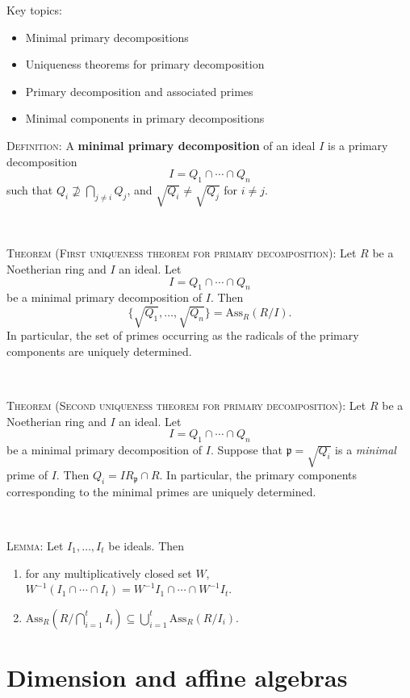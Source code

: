 \documentclass[12pt]{amsart}
\newcommand{\p}{\mathfrak{p}}
\newcommand{\Ass}{\mathrm{Ass}}
\newcommand{\0}{$\phantom{.}$}
\newcommand{\1}{\mathbbm{1}}
\begin{document}
  \begin{framed} Key topics:
\begin{itemize}
\item Minimal primary decompositions
\item Uniqueness theorems for primary decomposition
\item Primary decomposition and associated primes
\item Minimal components in primary decompositions
\end{itemize}
\end{framed}

\noindent \textsc{Definition:} A \textbf{minimal primary decomposition} of an ideal $I$ is a primary decomposition
\[ I = Q_1 \cap \cdots \cap Q_n\]
such that $Q_i \not\supseteq \bigcap_{j\neq i} Q_j$, and $\sqrt{Q_i} \neq \sqrt{Q_j}$ for $i\neq j$.

\

\noindent \textsc{Theorem (First uniqueness theorem for primary decomposition):} Let $R$ be a Noetherian ring and $I$ an ideal. Let \[I = Q_1 \cap \cdots \cap Q_n\] be a minimal primary decomposition of $I$. Then \[\{ \sqrt{Q_1},\dots,\sqrt{Q_n} \} = \Ass_R(R/I).\]
In particular, the set of primes occurring as the radicals of the primary components are uniquely determined.


\

\noindent \textsc{Theorem (Second uniqueness theorem for primary decomposition):} Let $R$ be a Noetherian ring and $I$ an ideal. Let \[I = Q_1 \cap \cdots \cap Q_n\] be a minimal primary decomposition of $I$. Suppose that $\p =\sqrt{Q_i}$ is a \emph{minimal} prime of $I$. Then ${Q_i = I R_{\p} \cap R}$.
In particular, the primary components corresponding to the minimal primes are uniquely determined.


\

\noindent \textsc{Lemma:} Let $I_1,\dots,I_t$ be ideals. Then
\begin{enumerate}
\item for any multiplicatively closed set $W$, $W^{-1}(I_1 \cap \cdots \cap I_t) = W^{-1} I_1 \cap \cdots \cap W^{-1}I_t$.
\item $\Ass_R\left(R/\bigcap_{i=1}^t I_i\right) \subseteq \bigcup_{i=1}^t \Ass_R(R/I_i)$.
\end{enumerate}



\newpage

\section{Dimension and affine algebras}
\end{document}
